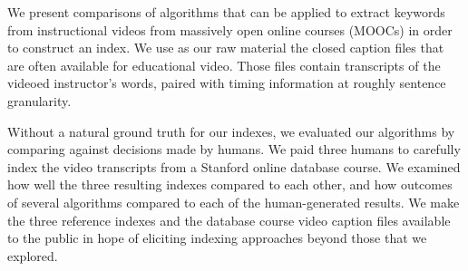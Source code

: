 We present comparisons of algorithms that can be applied to extract keywords
from instructional videos from massively open online courses (MOOCs) in order to
construct an index. We use as
our raw material the closed caption files that are often available for
educational video. Those files contain transcripts of the videoed
instructor's words, paired with timing information at roughly sentence
granularity.





Without a natural ground truth for our indexes, we evaluated our algorithms by comparing against decisions made by
humans. We paid three humans to carefully index the video transcripts
from a Stanford online database course.  We examined how well the
three resulting indexes compared to each other, and how outcomes of
several algorithms compared to each of the human-generated results. We
make the three reference indexes and the database course video caption
files available to the public in hope of eliciting indexing approaches
beyond those that we explored.

